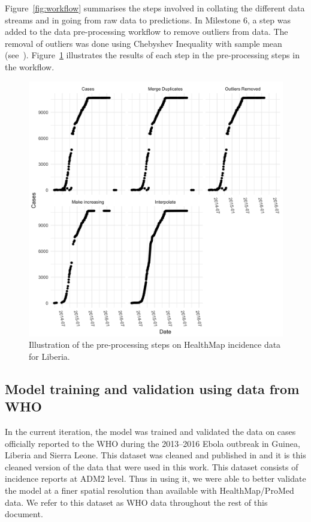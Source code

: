 \documentclass[11pt,]{article}
\begin{document}
Figure~\ref{fig:workflow} summarises the steps involved in collating
the different data streams and in going from raw data to predictions. In Milestone 6, a step was added to the data pre-processing workflow
to remove outliers from data. The removal of outliers was done using Chebyshev Inequality
with sample mean (see~\cite{saw1984chebyshev}). Figure~\ref{fig:wf_example} illustrates
the results of each step in the pre-processing steps in the workflow.

\begin{figure}
  \centering
  \includegraphics{ms6-figures/liberia-preprocessing}
  \caption{Illustration of the pre-processing steps on HealthMap incidence
    data for Liberia.}
  \label{fig:wf_example}
\end{figure}

\subsection{Model training and validation using data from
WHO}\label{model-training-and-validation-using-data-from-who}

In the current iteration, the model was trained and validated the data
on cases officially reported to the WHO during the 2013--2016 Ebola
outbreak in Guinea, Liberia and Sierra Leone. This dataset was cleaned
and published in \citep{garske20160308} and it is this cleaned version
of the data that were used in this work. This dataset consists of
incidence reports at ADM2 level. Thus in using it, we were able to
better validate the model at a finer spatial resolution than available
with HealthMap/ProMed data. We refer to this dataset as WHO data
throughout the rest of this document.
\end{document}
